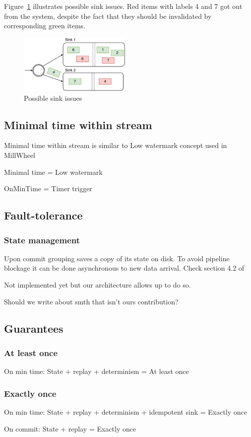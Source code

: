 Figure~\ref{invalidation-problems-figure} illustrates possible sink issues. Red items with labels 4 and 7 got out from the system, despite the fact that they should be invalidated by corresponding green items. 

\begin{figure}[htbp]
  \centering
  \includegraphics[width=0.48\textwidth]{pics/invalidation_problems}
  \caption{Possible sink issues}
  \label {invalidation-problems-figure}
\end{figure}

\subsection{Minimal time within stream}
Minimal time within stream is similar to Low watermark concept used in MillWheel~\cite{Akidau:2013:MFS:2536222.2536229}

Minimal time = Low watermark

OnMinTime = Timer trigger

\subsection{Fault-tolerance}

\subsubsection{State management}
Upon commit grouping saves a copy of its state on disk. To avoid pipeline blockage it can be done asynchronous to new data arrival. Check section 4.2 of \cite{Carbone:2017:SMA:3137765.3137777}

Not implemented yet but our architecture allows up to do so. 

Should we write about smth that isn't ours contribution?

\subsection{Guarantees}

\subsubsection{At least once}
On min time: State + replay + determinism = At least once

\subsubsection{Exactly once}
On min time: State + replay + determinism + idempotent sink = Exactly once

On commit: State + replay = Exactly once



